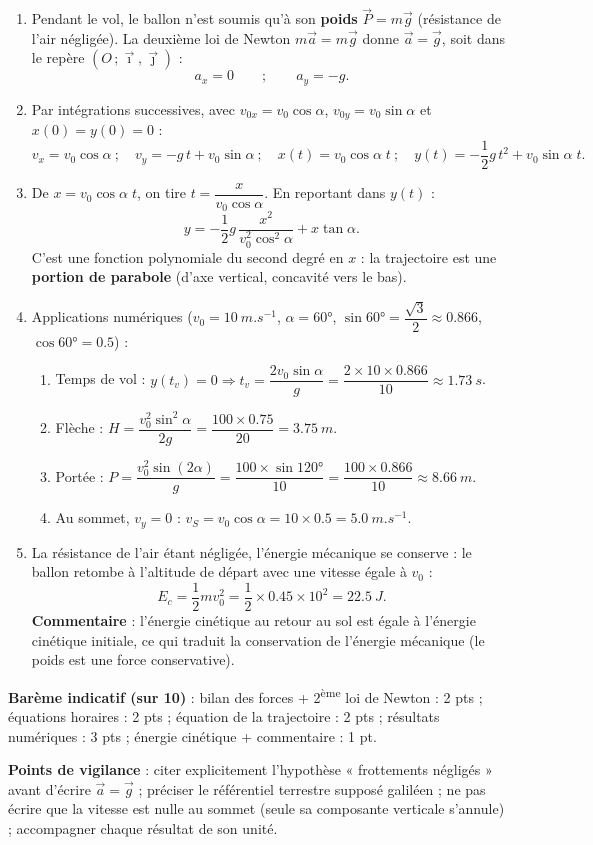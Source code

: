\documentclass[11pt]{article}
\begin{document}
\begin{corrige}
\begin{enumerate}
\item Pendant le vol, le ballon n'est soumis qu'à son \textbf{poids} $\vec{P} = m\vec{g}$ (résistance de l'air négligée). La deuxième loi de Newton $m\vec{a} = m\vec{g}$ donne $\vec{a} = \vec{g}$, soit dans le repère $(O\,;\vec{\imath},\vec{\jmath})$ :
\[ a_x = 0 \qquad ; \qquad a_y = -g. \]
\item Par intégrations successives, avec $v_{0x} = v_0\cos\alpha$, $v_{0y} = v_0\sin\alpha$ et $x(0) = y(0) = 0$ :
\[ v_x = v_0\cos\alpha \ ;\quad v_y = -g\,t + v_0\sin\alpha \ ;\quad \boxed{x(t) = v_0\cos\alpha\; t} \ ;\quad \boxed{y(t) = -\frac{1}{2}g\,t^2 + v_0\sin\alpha\; t}. \]
\item De $x = v_0\cos\alpha\; t$, on tire $t = \dfrac{x}{v_0\cos\alpha}$. En reportant dans $y(t)$ :
\[ y = -\frac{1}{2}g\,\frac{x^2}{v_0^2\cos^2\alpha} + x\tan\alpha. \]
C'est une fonction polynomiale du second degré en $x$ : la trajectoire est une \textbf{portion de parabole} (d'axe vertical, concavité vers le bas).
\item Applications numériques ($v_0 = \SI{10}{m.s^{-1}}$, $\alpha = 60°$, $\sin 60° = \dfrac{\sqrt{3}}{2}\approx \num{0,866}$, $\cos 60° = \num{0,5}$) :
\begin{enumerate}
\item Temps de vol : $y(t_v) = 0 \Rightarrow t_v = \dfrac{2v_0\sin\alpha}{g} = \dfrac{2\times 10\times \num{0,866}}{10} \approx \SI{1,73}{s}$.
\item Flèche : $H = \dfrac{v_0^2\sin^2\alpha}{2g} = \dfrac{100\times \num{0,75}}{20} = \SI{3,75}{m}$.
\item Portée : $P = \dfrac{v_0^2\sin(2\alpha)}{g} = \dfrac{100\times \sin 120°}{10} = \dfrac{100\times \num{0,866}}{10} \approx \SI{8,66}{m}$.
\item Au sommet, $v_y = 0$ : $v_S = v_0\cos\alpha = 10\times \num{0,5} = \SI{5,0}{m.s^{-1}}$.
\end{enumerate}
\item La résistance de l'air étant négligée, l'énergie mécanique se conserve : le ballon retombe à l'altitude de départ avec une vitesse égale à $v_0$ :
\[ E_c = \frac{1}{2}m v_0^2 = \frac{1}{2}\times \num{0,45}\times 10^2 = \SI{22,5}{J}. \]
\textbf{Commentaire} : l'énergie cinétique au retour au sol est égale à l'énergie cinétique initiale, ce qui traduit la conservation de l'énergie mécanique (le poids est une force conservative).
\end{enumerate}
\textbf{Barème indicatif (sur 10)} : bilan des forces + 2\textsuperscript{ème} loi de Newton : 2 pts ; équations horaires : 2 pts ; équation de la trajectoire : 2 pts ; résultats numériques : 3 pts ; énergie cinétique + commentaire : 1 pt.\par
\textbf{Points de vigilance} : citer explicitement l'hypothèse « frottements négligés » avant d'écrire $\vec{a} = \vec{g}$ ; préciser le référentiel terrestre supposé galiléen ; ne pas écrire que la vitesse est nulle au sommet (seule sa composante verticale s'annule) ; accompagner chaque résultat de son unité.
\end{corrige}
\end{document}
